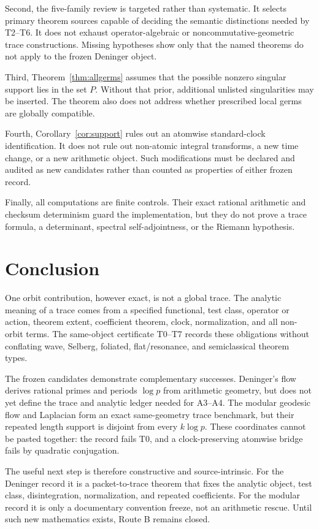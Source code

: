 \documentclass[11pt]{article}
\theoremstyle{definition}
\theoremstyle{remark}
\begin{document}
Second, the five-family review is targeted rather than systematic.  It
selects primary theorem sources capable of deciding the semantic distinctions
needed by T2--T6.  It does not exhaust operator-algebraic or
noncommutative-geometric trace constructions.  Missing hypotheses show only
that the named theorems do not apply to the frozen Deninger object.

Third, Theorem~\ref{thm:allgerms} assumes that the possible nonzero singular
support lies in the set \(P\).  Without that prior, additional unlisted
singularities may be inserted.  The theorem also does not address whether
prescribed local germs are globally compatible.

Fourth, Corollary~\ref{cor:support} rules out an atomwise standard-clock
identification.  It does not rule out non-atomic integral transforms, a new
time change, or a new arithmetic object.  Such modifications must be declared
and audited as new candidates rather than counted as properties of either
frozen record.

Finally, all computations are finite controls.  Their exact rational
arithmetic and checksum determinism guard the implementation, but they do not
prove a trace formula, a determinant, spectral self-adjointness, or the
Riemann hypothesis.

\section{Conclusion}

One orbit contribution, however exact, is not a global trace.  The analytic
meaning of a trace comes from a specified functional, test class, operator or
action, theorem extent, coefficient theorem, clock, normalization, and all
non-orbit terms.  The same-object certificate T0--T7 records these obligations
without conflating wave, Selberg, foliated, flat/resonance, and semiclassical
theorem types.

The frozen candidates demonstrate complementary successes.  Deninger's flow
derives rational primes and periods \(\log p\) from arithmetic geometry, but
does not yet define the trace and analytic ledger needed for A3--A4.  The
modular geodesic flow and Laplacian form an exact same-geometry trace
benchmark, but their repeated length support is disjoint from every
\(k\log p\).  These coordinates cannot be pasted together: the record fails
T0, and a clock-preserving atomwise bridge fails by quadratic conjugation.

The useful next step is therefore constructive and source-intrinsic.  For the
Deninger record it is a packet-to-trace theorem that fixes the analytic object,
test class, disintegration, normalization, and repeated coefficients.  For
the modular record it is only a documentary convention freeze, not an
arithmetic rescue.  Until such new mathematics exists, Route B remains closed.
\end{document}
